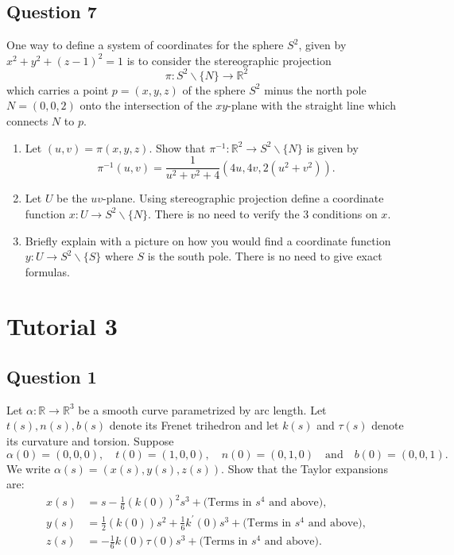 \documentclass[12pt, a4paper]{article}
\newcommand{\R}{\mathbb{R}}
\begin{document}
\subsection*{Question 7}
One way to define a system of coordinates for the sphere $S^{2}$, given by $x^{2}+y^{2}+(z-1)^{2}=1$ is to consider the stereographic projection
\[ \pi:S^{2}\backslash\{N\}\rightarrow\R^{2} \]
which carries a point $p=(x,y,z)$ of the sphere $S^{2}$ minus the north pole $N=(0,0,2)$ onto the intersection of the $xy$-plane with the straight line which connects $N$ to $p$.
\begin{enumerate}[label=(\roman*)]
    \item Let $(u,v)=\pi(x,y,z)$. Show that $\pi^{-1}:\R^{2}\rightarrow S^{2}\backslash\{N\}$ is given by
    \[ \pi^{-1}(u,v)=\frac{1}{u^{2}+v^{2}+4}(4u,4v,2(u^{2}+v^{2})). \]
    \item Let $U$ be the $uv$-plane. Using stereographic projection define a coordinate function $x:U\rightarrow S^{2}\backslash\{N\}$. There is no need to verify the 3 conditions on $x$.
    \item Briefly explain with a picture on how you would find a coordinate function $y:U\rightarrow S^{2}\backslash\{S\}$ where $S$ is the south pole. There is no need to give exact formulas.
\end{enumerate}
\newpage

\section*{Tutorial 3}

\subsection*{Question 1}
Let $\alpha:\R\rightarrow\R^{3}$ be a smooth curve parametrized by arc length. Let $t(s), n(s), b(s)$ denote its Frenet trihedron and let $k(s)$ and $\tau(s)$ denote its curvature and torsion. Suppose
\[ \alpha(0)=(0,0,0), \quad t(0)=(1,0,0), \quad n(0)=(0,1,0) \quad \text{and} \quad b(0)=(0,0,1). \]
We write $\alpha(s)=(x(s),y(s),z(s))$. Show that the Taylor expansions are:
\begin{align*}
    x(s) &= s-\frac{1}{6}(k(0))^{2}s^{3}+\text{(Terms in $s^{4}$ and above)}, \\
    y(s) &= \frac{1}{2}(k(0))s^{2}+\frac{1}{6}k^{\prime}(0)s^{3}+\text{(Terms in $s^{4}$ and above)}, \\
    z(s) &= -\frac{1}{6}k(0)\tau(0)s^{3}+\text{(Terms in $s^{4}$ and above)}.
\end{align*}
\end{document}
